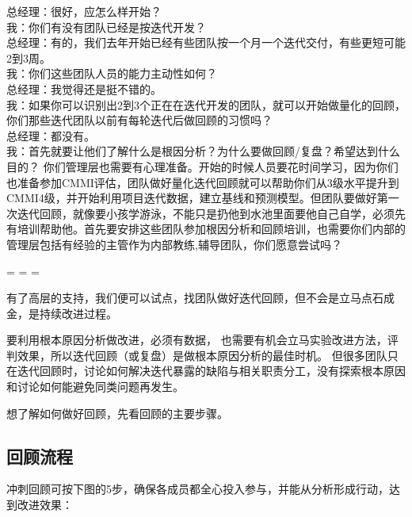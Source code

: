
总经理：很好，应怎么样开始？\\
我：你们有没有团队已经是按迭代开发？ \\
总经理：有的，我们去年开始已经有些团队按一个月一个迭代交付，有些更短可能2到3周。\\
我：你们这些团队人员的能力主动性如何？\\
总经理：我觉得还是挺不错的。\\
我：如果你可以识别出2到3个正在在迭代开发的团队，就可以开始做量化的回顾，你们那些迭代团队以前有每轮迭代后做回顾的习惯吗？\\
总经理：都没有。\\
我：首先就要让他们了解什么是根因分析？为什么要做回顾/复盘？希望达到什么目的？ 你们管理层也需要有心理准备。开始的时候人员要花时间学习，因为你们也准备参加CMMI评估，团队做好量化迭代回顾就可以帮助你们从3级水平提升到CMMI4级，并开始利用项目迭代数据，建立基线和预测模型。但团队要做好第一次迭代回顾，就像要小孩学游泳，不能只是扔他到水池里面要他自己自学，必须先有培训帮助他。首先要安排这些团队参加根因分析和回顾培训，也需要你们内部的管理层包括有经验的主管作为内部教练,辅导团队，你们愿意尝试吗？\\

\begin{description}
\tightlist
\item[]
= = =
\end{description}

有了高层的支持，我们便可以试点，找团队做好迭代回顾，但不会是立马点石成金，是持续改进过程。

要利用根本原因分析做改进，必须有数据， 也需要有机会立马实验改进方法，评判效果，所以迭代回顾（或复盘）是做根本原因分析的最佳时机。 但很多团队只在迭代回顾时，讨论如何解决迭代暴露的缺陷与相关职责分工，没有探索根本原因和讨论如何能避免同类问题再发生。

想了解如何做好回顾，先看回顾的主要步骤。

\hypertarget{ux56deux987eux6d41ux7a0b}{%
\subsection{回顾流程}\label{ux56deux987eux6d41ux7a0b}}

冲刺回顾可按下图的5步，确保各成员都全心投入参与，并能从分析形成行动，达到改进效果：\\


